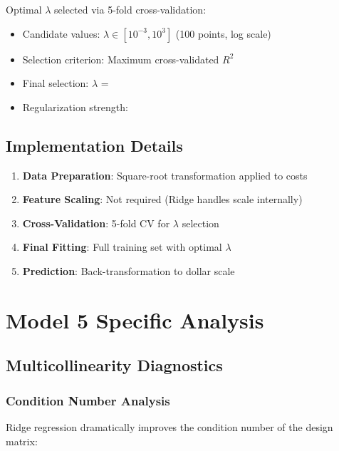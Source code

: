 Optimal $\lambda$ selected via 5-fold cross-validation:
\begin{itemize}
    \item Candidate values: $\lambda \in [10^{-3}, 10^{3}]$ (100 points, log scale)
    \item Selection criterion: Maximum cross-validated $R^2$
    \item Final selection: $\lambda$ = \ModelFiveAlpha{}
    \item Regularization strength: \ModelFiveRegularizationStrength{}
\end{itemize}

\subsection{Implementation Details}

\begin{enumerate}
    \item \textbf{Data Preparation}: Square-root transformation applied to costs
    \item \textbf{Feature Scaling}: Not required (Ridge handles scale internally)
    \item \textbf{Cross-Validation}: 5-fold CV for $\lambda$ selection
    \item \textbf{Final Fitting}: Full training set with optimal $\lambda$
    \item \textbf{Prediction}: Back-transformation to dollar scale
\end{enumerate}



\section{Model 5 Specific Analysis}

\subsection{Multicollinearity Diagnostics}

\subsubsection{Condition Number Analysis}

Ridge regression dramatically improves the condition number of the design matrix:

